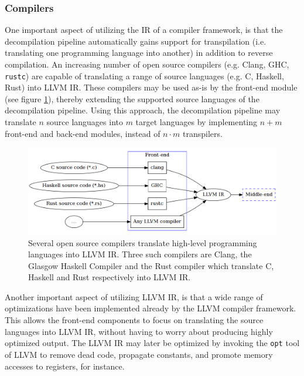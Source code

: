 
\subsubsection{Compilers}
\label{sec:compilers}

One important aspect of utilizing the IR of a compiler framework, is that the decompilation pipeline automatically gains support for transpilation (i.e. translating one programming language into another) in addition to reverse compilation. An increasing number of open source compilers (e.g. Clang, GHC, \texttt{rustc}) are capable of translating a range of source languages (e.g. C, Haskell, Rust) into LLVM IR. These compilers may be used as-is by the front-end module (see figure \ref{fig:front-end_source}), thereby extending the supported source languages of the decompilation pipeline. Using this approach, the decompilation pipeline may translate $ n $ source languages into $ m $ target languages by implementing $ n + m $ front-end and back-end modules, instead of $ n \cdot m $ transpilers.

\begin{figure}[htbp]
	\begin{center}
		\includegraphics[width=\textwidth]{inc/front-end_source.png}
		\caption{Several open source compilers translate high-level programming languages into LLVM IR. Three such compilers are Clang, the Glasgow Haskell Compiler and the Rust compiler which translate C, Haskell and Rust respectively into LLVM IR.}
		\label{fig:front-end_source}
	\end{center}
\end{figure}

Another important aspect of utilizing LLVM IR, is that a wide range of optimizations have been implemented already by the LLVM compiler framework. This allows the front-end components to focus on translating the source languages into LLVM IR, without having to worry about producing highly optimized output. The LLVM IR may later be optimized by invoking the \texttt{opt} tool of LLVM to remove dead code, propagate constants, and promote memory accesses to registers, for instance.

